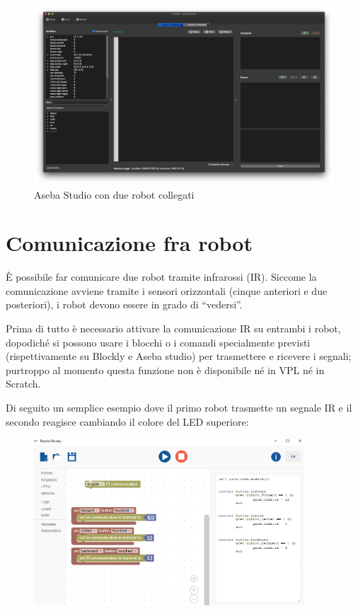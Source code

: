 \documentclass[12pt]{article}
\begin{document}
	
	\begin{figure}[H]
		\includegraphics[width=\textwidth]{img/multiRobot.png}
		\caption{Aseba Studio con due robot collegati}
		\label{multiRobot}
	\end{figure}
	
	\newpage
	
	
\section{Comunicazione fra robot}\label{network}

	È possibile far comunicare due robot tramite infrarossi (IR). Siccome la comunicazione avviene tramite i sensori orizzontali (cinque anteriori e due posteriori), i robot devono essere in grado di ``vedersi''.
	
	Prima di tutto è necessario attivare la comunicazione IR su entrambi i robot, dopodiché si possono usare i blocchi o i comandi specialmente previsti (rispettivamente su Blockly e Aseba studio) per trasmettere e ricevere i segnali; purtroppo al momento questa funzione non è disponibile né in VPL né in Scratch.
	
	Di seguito un semplice esempio dove il primo robot trasmette un segnale IR e il secondo reagisce cambiando il colore del LED superiore: 
	
	\begin{figure}[H]
		\centering
		\includegraphics[width=0.9\textwidth]{img/blocklyIR1.png}
		\label{blocklyIR1}
	\end{figure}
		
\end{document}
